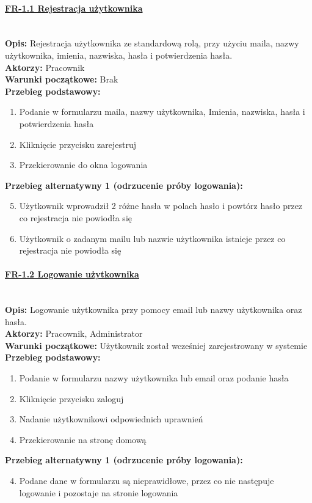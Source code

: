\paragraph{\underline{FR-1.1 Rejestracja użytkownika}}\mbox{}\\[1mm]
	\noindent\textbf{Opis:} Rejestracja użytkownika ze standardową rolą, przy użyciu maila, nazwy użytkownika, imienia, nazwiska, hasła i potwierdzenia hasła.\\
	\noindent\textbf{Aktorzy:} Pracownik\\
	\textbf{Warunki początkowe:} Brak\\
	\textbf{Przebieg podstawowy:}
	\begin{enumerate}[noparskip]
		\item Podanie w formularzu maila, nazwy użytkownika, Imienia, nazwiska, hasła i potwierdzenia hasła
    \item Kliknięcie przycisku zarejestruj
		\item Przekierowanie do okna logowania
	\end{enumerate}
	\textbf{Przebieg alternatywny 1 (odrzucenie próby logowania):}
	\begin{enumerate}[noparskip]\setcounter{enumi}{4}
		\item Użytkownik wprowadził 2 różne hasła w polach hasło i powtórz hasło przez co rejestracja nie powiodła się
		\item Użytkownik o zadanym mailu lub nazwie użytkownika istnieje przez co rejestracja nie powiodła się
	\end{enumerate}	

\paragraph{\underline{FR-1.2 Logowanie użytkownika}}\mbox{}\\[1mm]
	\noindent\textbf{Opis:} Logowanie użytkownika przy pomocy email lub nazwy użytkownika oraz hasła.\\
	\noindent\textbf{Aktorzy:} Pracownik, Administrator\\
	\textbf{Warunki początkowe:} Użytkownik został wcześniej zarejestrowany w systemie\\
	\textbf{Przebieg podstawowy:}
	\begin{enumerate}[noparskip]
		\item Podanie w formularzu nazwy użytkownika lub email oraz podanie hasła
    \item Kliknięcie przycisku zaloguj
		\item Nadanie użytkownikowi odpowiednich uprawnień
		\item Przekierowanie na stronę domową
	\end{enumerate} 
	\indent \textbf{Przebieg alternatywny 1 (odrzucenie próby logowania):}
	\begin{enumerate}[noparskip]\setcounter{enumi}{3}
		\item Podane dane w formularzu są nieprawidłowe, przez co nie następuje logowanie i pozostaje na stronie logowania
	\end{enumerate}	


